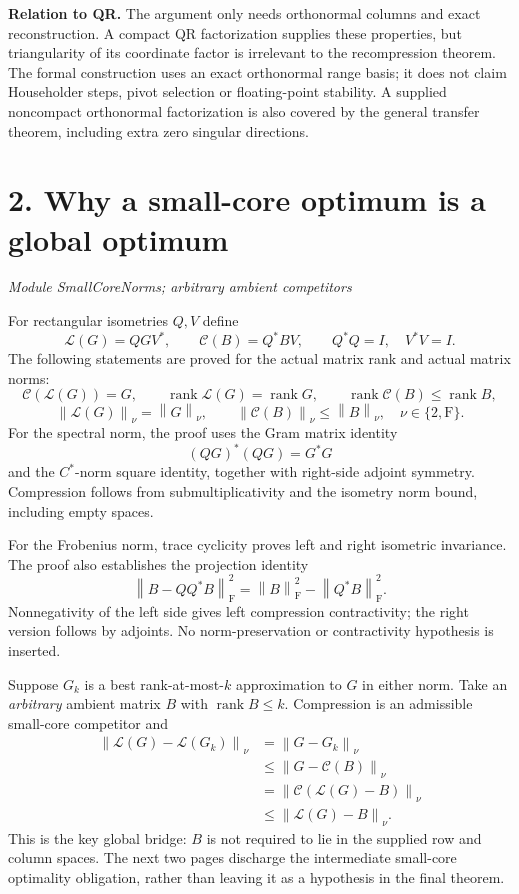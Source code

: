 \documentclass[11pt]{article}
\newcommand{\norm}[1]{\left\lVert#1\right\rVert}
\newcommand{\rank}{\operatorname{rank}}
\newcommand{\pageheading}[2]{\section*{\color{ink}#1}\textit{#2}\par}
\begin{document}
\textbf{Relation to QR.} The argument only needs orthonormal columns and exact reconstruction. A compact QR factorization supplies these properties, but triangularity of its coordinate factor is irrelevant to the recompression theorem. The formal construction uses an exact orthonormal range basis; it does not claim Householder steps, pivot selection or floating-point stability. A supplied noncompact orthonormal factorization is also covered by the general transfer theorem, including extra zero singular directions.

\newpage
\pageheading{2. Why a small-core optimum is a global optimum}{Module SmallCoreNorms; arbitrary ambient competitors}
For rectangular isometries $Q,V$ define
\[
\mathcal L(G)=QGV^*,\qquad \mathcal C(B)=Q^*BV,
\qquad Q^*Q=I,\quad V^*V=I.
\]
The following statements are proved for the actual matrix rank and actual matrix norms:
\[
\mathcal C(\mathcal L(G))=G,
\qquad \rank\mathcal L(G)=\rank G,
\qquad \rank\mathcal C(B)\leq\rank B,
\]
\[
\boxed{\norm{\mathcal L(G)}_\nu=\norm{G}_\nu,
\qquad \norm{\mathcal C(B)}_\nu\leq\norm B_\nu,
\quad \nu\in\{2,\mathrm F\}.}
\]
For the spectral norm, the proof uses the Gram matrix identity
\[
(QG)^*(QG)=G^*G
\]
and the $C^*$-norm square identity, together with right-side adjoint symmetry. Compression follows from submultiplicativity and the isometry norm bound, including empty spaces.

For the Frobenius norm, trace cyclicity proves left and right isometric invariance. The proof also establishes the projection identity
\[
\norm{B-QQ^*B}_{\mathrm F}^{2}
=\norm B_{\mathrm F}^{2}-\norm{Q^*B}_{\mathrm F}^{2}.
\]
Nonnegativity of the left side gives left compression contractivity; the right version follows by adjoints. No norm-preservation or contractivity hypothesis is inserted.

Suppose $G_k$ is a best rank-at-most-$k$ approximation to $G$ in either norm. Take an \emph{arbitrary} ambient matrix $B$ with $\rank B\leq k$. Compression is an admissible small-core competitor and
\[
\begin{aligned}
\norm{\mathcal L(G)-\mathcal L(G_k)}_\nu
&=\norm{G-G_k}_\nu\\
&\leq\norm{G-\mathcal C(B)}_\nu\\
&=\norm{\mathcal C(\mathcal L(G)-B)}_\nu\\
&\leq\norm{\mathcal L(G)-B}_\nu.
\end{aligned}
\]
This is the key global bridge: $B$ is not required to lie in the supplied row and column spaces. The next two pages discharge the intermediate small-core optimality obligation, rather than leaving it as a hypothesis in the final theorem.
\end{document}
